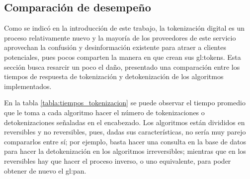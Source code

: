 %
%
%

\subsection{Comparación de desempeño}
\label{sec:comparacion}

Como se indicó en la introducción de este trabajo, la tokenización digital es un
proceso relativamente nuevo y la mayoría de los proveedores de este servicio
aprovechan la confusión y desinformación existente para atraer a clientes
potenciales, pues pocos comparten la manera en que crean sus \glspl{gl:token}.
Esta sección busca resarcir un poco el daño, presentado una comparación entre
los tiempos de respuesta de tokenización y detokenización de los algoritmos
implementados.

En la tabla \ref{tabla:tiempos_tokenizacion} se puede observar el tiempo
promedio que le toma a cada algoritmo hacer el número de tokenizaciones o
detokenizaciones señaladas en el encabezado. Los algoritmos están
divididos en reversibles y no reversibles, pues, dadas sus características, no
sería muy parejo compararlos entre sí; por ejemplo, basta hacer una consulta
en la base de datos para hacer la detokenización en los algoritmos
irreversibles; mientras que en los reversibles hay que hacer el proceso inverso,
o uno equivalente, para poder obtener de nuevo el \gls{gl:pan}.

